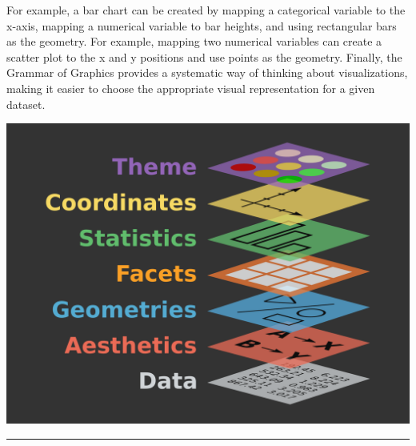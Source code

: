 \documentclass[print]{nuthesis}
\begin{document}
For example, a bar chart can be created by mapping a categorical variable to the x-axis, mapping a numerical variable to bar heights, and using rectangular bars as the geometry. For example, mapping two numerical variables can create a scatter plot to the x and y positions and use points as the geometry. Finally, the Grammar of Graphics provides a systematic way of thinking about visualizations, making it easier to choose the appropriate visual representation for a given dataset.

\begin{center}
\includegraphics[width=\textwidth]{figure/gglayers}
\end{center}

\begin{center}\rule{0.5\linewidth}{0.5pt}\end{center}
\end{document}
